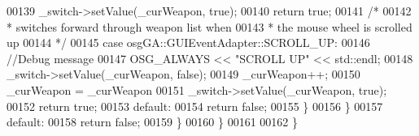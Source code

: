 \begin{DoxyCode}
00139                 \_switch->setValue(\_curWeapon, \textcolor{keyword}{true});
00140                 \textcolor{keywordflow}{return} \textcolor{keyword}{true};
00141         \textcolor{comment}{/*}
00142 \textcolor{comment}{         * switches forward through weapon list when}
00143 \textcolor{comment}{         * the mouse wheel is scrolled up}
00144 \textcolor{comment}{         */}
00145         \textcolor{keywordflow}{case} osgGA::GUIEventAdapter::SCROLL\_UP:
00146           \textcolor{comment}{//Debug message}
00147                 OSG\_ALWAYS << \textcolor{stringliteral}{"SCROLL UP"} << std::endl;
00148                 \_switch->setValue(\_curWeapon, \textcolor{keyword}{false});
00149                 \_curWeapon++;
00150                 \_curWeapon = \_curWeapon %
00151                 \_switch->setValue(\_curWeapon, \textcolor{keyword}{true});
00152                 \textcolor{keywordflow}{return} \textcolor{keyword}{true};
00153             \textcolor{keywordflow}{default}:
00154                 \textcolor{keywordflow}{return} \textcolor{keyword}{false};
00155             \}
00156         \}
00157         \textcolor{keywordflow}{default}:
00158             \textcolor{keywordflow}{return} \textcolor{keyword}{false};
00159         \}
00160     \}
00161 
00162 \}
\end{DoxyCode}
